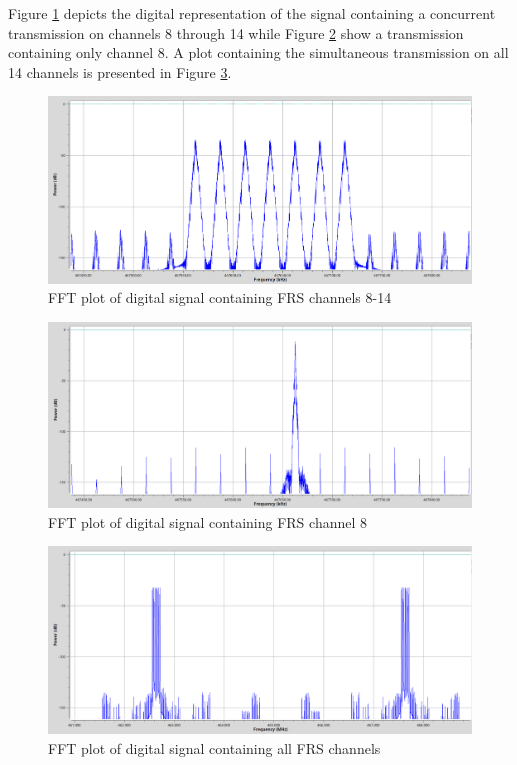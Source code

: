 Figure \ref{fig:osmo-ch8-14} depicts the digital representation of the signal
containing a concurrent transmission on channels 8 through 14 while Figure
\ref{fig:osmo-ch8} show a transmission containing only channel 8. A plot
containing the simultaneous transmission on all 14 channels is presented in
Figure \ref{fig:osmo-all}.

\begin{figure}[H]
  \centering
  \includegraphics[width=4.75in]{images/frs/results/osmo-ch8-14.png}
  \caption{FFT plot of digital signal containing FRS channels 8-14}
  \label{fig:osmo-ch8-14}
\end{figure}

\begin{figure}[H]
  \centering
  \includegraphics[width=4.75in]{images/frs/results/osmo-ch8.png}
  \caption{FFT plot of digital signal containing FRS channel 8}
  \label{fig:osmo-ch8}
\end{figure}

\begin{figure}[H]
  \centering
  \includegraphics[width=4.75in]{images/frs/results/osmo_all_ch.png}
  \caption{FFT plot of digital signal containing all FRS channels}
  \label{fig:osmo-all}
\end{figure}

